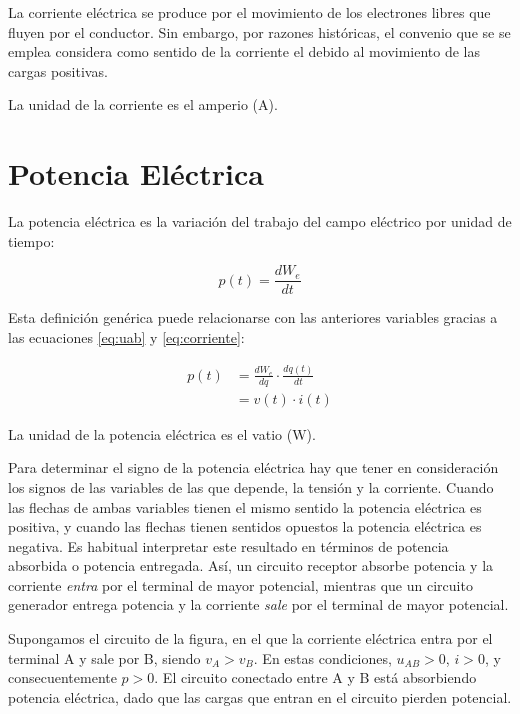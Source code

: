 La corriente eléctrica se produce por el movimiento de los electrones libres que fluyen por el conductor. Sin embargo, por razones históricas, el convenio que se se emplea considera como sentido de la corriente el debido al movimiento de las cargas positivas.

La unidad de la corriente es el amperio (A).
\section{Potencia Eléctrica}
\label{sec:potencia}

La potencia eléctrica es la variación del trabajo del campo eléctrico por unidad de tiempo:

\begin{equation}
  \label{eq:potencia_general}
  p(t)=\frac{dW_{e}}{dt}
\end{equation}

Esta definición genérica puede relacionarse con las anteriores variables gracias a las ecuaciones \ref{eq:uab} y \ref{eq:corriente}:

\begin{align}
  \label{eq:potencia_vi}
  p(t) &= \frac{dW_e}{dq} \cdot \frac{dq(t)}{dt}\\
       &= v(t)\cdot i(t)
\end{align}

La unidad de la potencia eléctrica es el vatio (W).

Para determinar el signo de la potencia eléctrica hay que tener en consideración los signos de las variables de las que depende, la tensión y la corriente. Cuando las flechas de ambas variables tienen el mismo sentido la potencia eléctrica es positiva, y cuando las flechas tienen sentidos opuestos la potencia eléctrica es negativa. Es habitual interpretar este resultado en términos de potencia absorbida o potencia entregada. Así, un circuito receptor absorbe potencia y la corriente \emph{entra} por el terminal de mayor potencial, mientras que un circuito generador entrega potencia y la corriente \emph{sale} por el terminal de mayor potencial.

Supongamos el circuito de la figura, en el que la corriente eléctrica entra por el terminal A y sale por B, siendo $v_A > v_B$. En estas condiciones, $u_{AB} > 0$, $i > 0$, y consecuentemente $p > 0$.  El circuito conectado entre A y B está absorbiendo potencia eléctrica, dado que las cargas que entran en el circuito pierden potencial.
